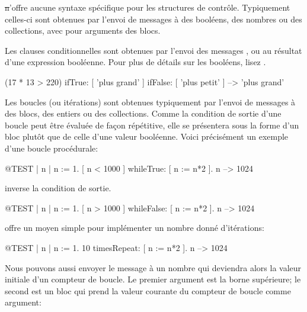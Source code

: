 \documentclass[a4paper,10pt,twoside]{book}
\begin{document}
\st n'offre aucune syntaxe spécifique pour les structures de contrôle.
Typiquement celles-ci sont obtenues par l'envoi de messages à des booléens, 
des nombres ou des collections, avec pour arguments des blocs.

Les clauses conditionnelles sont obtenues par l'envoi des messages
,  ou
 au résultat d'une expression
booléenne. Pour plus de détails sur les booléens, lisez .

\begin{code}{}
(17 * 13 > 220)
   ifTrue: [ 'plus grand' ]
   ifFalse: [ 'plus petit' ] --> 'plus grand'
\end{code}

Les boucles (ou itérations) sont obtenues typiquement par l'envoi de messages à des blocs, des entiers ou des collections.
Comme la condition de sortie d'une boucle peut être évaluée de façon répétitive, elle se présentera sous la forme d'un bloc plutôt que de celle d'une valeur booléenne.
Voici précisément un exemple d'une boucle procédurale:

\begin{code}{@TEST | n |}
n := 1.
[ n < 1000 ] whileTrue: [ n := n*2 ].
n --> 1024
\end{code}

\noindent
{} inverse la condition de sortie.

\begin{code}{@TEST | n |}
n := 1.
[ n > 1000 ] whileFalse: [ n := n*2 ].
n --> 1024
\end{code}

\noindent
{} offre un moyen simple pour implémenter un nombre donné d'itérations:
\begin{code}{@TEST | n |}
n := 1.
10 timesRepeat: [ n := n*2 ].
n --> 1024
\end{code}
Nous pouvons aussi envoyer le message  à un
nombre qui deviendra alors la valeur initiale d'un compteur de boucle.
Le premier argument est la borne supérieure; le second est un bloc qui 
prend la valeur courante du compteur de boucle comme argument:
\end{document}
